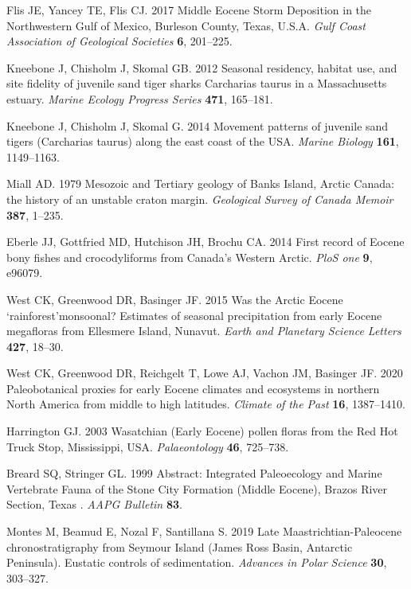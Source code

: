 \documentclass[]{rsos}%
\begin{document}
\begin{thebibliography}{99}
Flis JE, Yancey TE, Flis CJ. 2017  {Middle Eocene Storm Deposition in the
  Northwestern Gulf of Mexico, Burleson County, Texas, U.S.A}. {\em Gulf Coast
  Association of Geological Societies} \textbf{6}, 201--225.

Kneebone J, Chisholm J, Skomal GB. 2012  {Seasonal residency, habitat use, and
  site fidelity of juvenile sand tiger sharks Carcharias taurus in a
  Massachusetts estuary}. {\em Marine Ecology Progress Series} \textbf{471},
  165--181.

Kneebone J, Chisholm J, Skomal G. 2014  Movement patterns of juvenile sand
  tigers (Carcharias taurus) along the east coast of the USA. {\em Marine
  Biology} \textbf{161}, 1149--1163.

Miall AD. 1979  {Mesozoic and Tertiary geology of Banks Island, Arctic Canada:
  the history of an unstable craton margin}. {\em Geological Survey of Canada
  Memoir} \textbf{387}, 1--235.

Eberle JJ, Gottfried MD, Hutchison JH, Brochu CA. 2014  First record of Eocene
  bony fishes and crocodyliforms from Canada’s Western Arctic. {\em PloS one}
  \textbf{9}, e96079.

West CK, Greenwood DR, Basinger JF. 2015  Was the Arctic Eocene
  ‘rainforest’monsoonal? Estimates of seasonal precipitation from early
  Eocene megafloras from Ellesmere Island, Nunavut. {\em Earth and Planetary
  Science Letters} \textbf{427}, 18--30.

West CK, Greenwood DR, Reichgelt T, Lowe AJ, Vachon JM, Basinger JF. 2020
  Paleobotanical proxies for early Eocene climates and ecosystems in northern
  North America from middle to high latitudes. {\em Climate of the Past}
  \textbf{16}, 1387--1410.

Harrington GJ. 2003  {Wasatchian (Early Eocene) pollen floras from the Red Hot
  Truck Stop, Mississippi, USA}. {\em Palaeontology} \textbf{46}, 725--738.

Breard SQ, Stringer GL. 1999  {Abstract: Integrated Paleoecology and Marine
  Vertebrate Fauna of the Stone City Formation (Middle Eocene), Brazos River
  Section, Texas }. {\em AAPG Bulletin} \textbf{83}.

Montes M, Beamud E, Nozal F, Santillana S. 2019  Late Maastrichtian-Paleocene
  chronostratigraphy from Seymour Island (James Ross Basin, Antarctic
  Peninsula). Eustatic controls of sedimentation. {\em Advances in Polar
  Science} \textbf{30}, 303--327.


\end{thebibliography}
\end{document}
